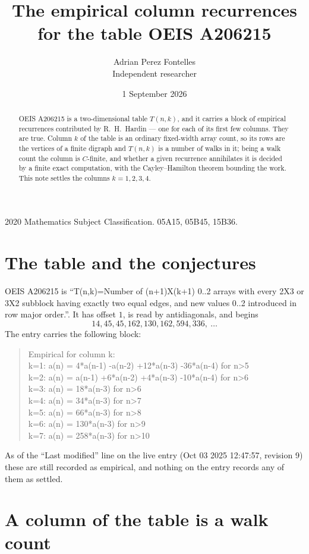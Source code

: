 \documentclass[11pt,a4paper]{article}
\title{The empirical column recurrences for the table OEIS A206215}
\author{Adrian Perez Fontelles\\ \small Independent researcher}
\date{1 September 2026}
\theoremstyle{plain}
\theoremstyle{definition}
\begin{document}
\maketitle

\begin{abstract}
OEIS A206215 is a two-dimensional table $T(n,k)$, and it carries a block of empirical
recurrences contributed by R.~H.~Hardin --- one for each of its first few columns. They are
true. Column $k$ of the table is an ordinary fixed-width array count, so its rows are the
vertices of a finite digraph and $T(n,k)$ is a number of walks in it; being a walk count the
column is $C$-finite, and whether a given recurrence annihilates it is decided by a finite
exact computation, with the Cayley--Hamilton theorem bounding the work. This note settles the columns $k=1, 2, 3, 4$.
\end{abstract}

\noindent\small 2020 Mathematics Subject Classification. 05A15, 05B45, 15B36.\normalsize

\section{The table and the conjectures}

OEIS A206215 is ``T(n,k)=Number of (n+1)X(k+1) 0..2 arrays with every 2X3 or 3X2 subblock having exactly two equal edges, and new values 0..2 introduced in row major order.''. It has offset $1$, is
read by antidiagonals, and begins
\[
14, 45, 45, 162, 130, 162, 594, 336,\ \dots
\]
The entry carries the following block:
\begin{quote}\small
Empirical for column k:\\
k=1: a(n) = 4*a(n-1) -a(n-2) +12*a(n-3) -36*a(n-4) for n>5\\
k=2: a(n) = a(n-1) +6*a(n-2) +4*a(n-3) -10*a(n-4) for n>6\\
k=3: a(n) = 18*a(n-3) for n>6\\
k=4: a(n) = 34*a(n-3) for n>7\\
k=5: a(n) = 66*a(n-3) for n>8\\
k=6: a(n) = 130*a(n-3) for n>9\\
k=7: a(n) = 258*a(n-3) for n>10\\
\end{quote}
As of the ``Last modified'' line on the live entry (Oct 03 2025 12:47:57, revision 9) these are still
recorded as empirical, and nothing on the entry records any of them as settled.

\section{A column of the table is a walk count}
\end{document}
